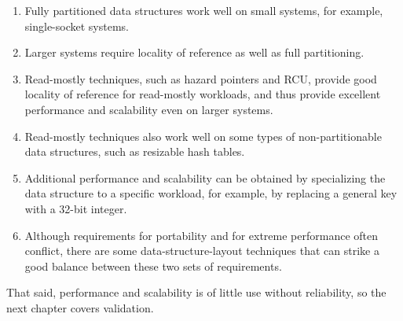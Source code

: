 \begin{enumerate}
\item	Fully partitioned data structures work well on small systems,
	for example, single-socket systems.
\item	Larger systems require locality of reference as well as
	full partitioning.
\item	Read-mostly techniques, such as hazard pointers and RCU,
	provide good locality of reference for read-mostly workloads,
	and thus provide excellent performance and scalability even
	on larger systems.
\item	Read-mostly techniques also work well on some types of
	non-partitionable data structures, such as resizable hash tables.
\item	Additional performance and scalability can be obtained by
	specializing the data structure to a specific workload,
	for example, by replacing a general key with a 32-bit integer.
\item	Although requirements for portability and for extreme performance
	often conflict, there are some data-structure-layout techniques
	that can strike a good balance between these two sets of
	requirements.
\end{enumerate}

That said, performance and scalability is of little use without reliability,
so the next chapter covers validation.
